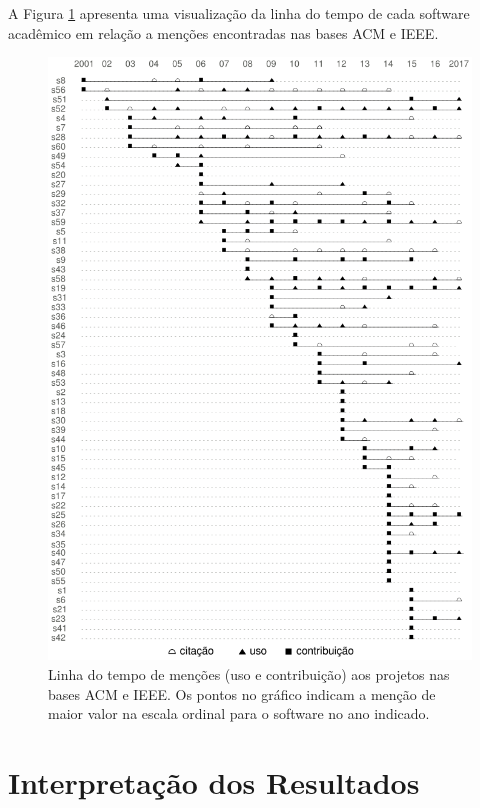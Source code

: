 A Figura \ref{mentions-timeline} apresenta uma visualização da linha do tempo
de cada software acadêmico em relação a menções encontradas nas bases ACM e IEEE.

\begin{figure}[h]
  \center
  \includegraphics[scale=0.6]{imagens/mentions-timeline.png}
  \caption{Linha do tempo de menções (uso e contribuição) aos projetos nas bases ACM e IEEE.
           Os pontos no gráfico indicam a menção de maior valor na escala ordinal para o software no ano indicado.}
  \label{mentions-timeline}
\end{figure}


\section{Interpretação dos Resultados} \label{estudo2:interpretacao} %

